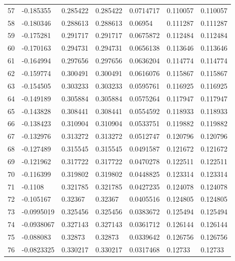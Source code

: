 \begin{longtable}{l|lll|lll}
  57 & -0.185355    & 0.285422    & 0.285422    &  0.0714717   & 0.110057    & 0.110057    \\
  58 & -0.180346    & 0.288613    & 0.288613    &  0.06954     & 0.111287    & 0.111287    \\
  59 & -0.175281    & 0.291717    & 0.291717    &  0.0675872   & 0.112484    & 0.112484    \\
  60 & -0.170163    & 0.294731    & 0.294731    &  0.0656138   & 0.113646    & 0.113646    \\
  61 & -0.164994    & 0.297656    & 0.297656    &  0.0636204   & 0.114774    & 0.114774    \\
  62 & -0.159774    & 0.300491    & 0.300491    &  0.0616076   & 0.115867    & 0.115867    \\
  63 & -0.154505    & 0.303233    & 0.303233    &  0.0595761   & 0.116925    & 0.116925    \\
  64 & -0.149189    & 0.305884    & 0.305884    &  0.0575264   & 0.117947    & 0.117947    \\
  65 & -0.143828    & 0.308441    & 0.308441    &  0.0554592   & 0.118933    & 0.118933    \\
  66 & -0.138423    & 0.310904    & 0.310904    &  0.0533751   & 0.119882    & 0.119882    \\
  67 & -0.132976    & 0.313272    & 0.313272    &  0.0512747   & 0.120796    & 0.120796    \\
  68 & -0.127489    & 0.315545    & 0.315545    &  0.0491587   & 0.121672    & 0.121672    \\
  69 & -0.121962    & 0.317722    & 0.317722    &  0.0470278   & 0.122511    & 0.122511    \\
  70 & -0.116399    & 0.319802    & 0.319802    &  0.0448825   & 0.123314    & 0.123314    \\
  71 & -0.1108      & 0.321785    & 0.321785    &  0.0427235   & 0.124078    & 0.124078    \\
  72 & -0.105167    & 0.32367     & 0.32367     &  0.0405516   & 0.124805    & 0.124805    \\
  73 & -0.0995019   & 0.325456    & 0.325456    &  0.0383672   & 0.125494    & 0.125494    \\
  74 & -0.0938067   & 0.327143    & 0.327143    &  0.0361712   & 0.126144    & 0.126144    \\
  75 & -0.088083    & 0.32873     & 0.32873     &  0.0339642   & 0.126756    & 0.126756    \\
  76 & -0.0823325   & 0.330217    & 0.330217    &  0.0317468   & 0.12733     & 0.12733     \\

\end{longtable}
